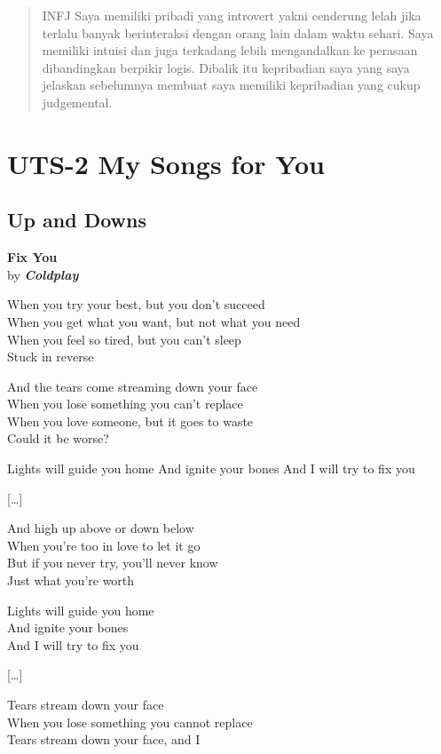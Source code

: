 \documentclass[
  letterpaper,
  DIV=11,
  numbers=noendperiod]{scrreprt}
\begin{document}
\begin{quote}
INFJ Saya memiliki pribadi yang introvert yakni cenderung lelah jika
terlalu banyak berinteraksi dengan orang lain dalam waktu sehari. Saya
memiliki intuisi dan juga terkadang lebih mengandalkan ke perasaan
dibandingkan berpikir logis. Dibalik itu kepribadian saya yang saya
jelaskan sebelumnya membuat saya memiliki kepribadian yang cukup
judgemental.
\end{quote}


\chapter{UTS-2 My Songs for You}\label{uts-2-my-songs-for-you}

\section{Up and Downs}\label{up-and-downs}

\textbf{Fix You}\\
by \textbf{\emph{Coldplay}}

When you try your best, but you don't succeed\\
When you get what you want, but not what you need\\
When you feel so tired, but you can't sleep\\
Stuck in reverse

And the tears come streaming down your face\\
When you lose something you can't replace\\
When you love someone, but it goes to waste\\
Could it be worse?

Lights will guide you home And ignite your bones And I will try to fix
you

{[}\ldots{]}

And high up above or down below\\
When you're too in love to let it go\\
But if you never try, you'll never know\\
Just what you're worth

Lights will guide you home\\
And ignite your bones\\
And I will try to fix you

{[}\ldots{]}

Tears stream down your face\\
When you lose something you cannot replace\\
Tears stream down your face, and I
\end{document}
